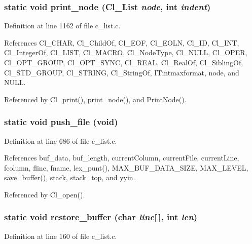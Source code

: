 \subsubsection{\setlength{\rightskip}{0pt plus 5cm}static void print\_\-node (\bf{Cl\_\-List} {\em node}, int {\em indent})\hspace{0.3cm}{\tt  [static]}}\label{c__list_8c_5ea3000e9486033d0f247911774ad4b1}




Definition at line 1162 of file c\_\-list.c.

References Cl\_\-CHAR, Cl\_\-Child\-Of, Cl\_\-EOF, Cl\_\-EOLN, Cl\_\-ID, Cl\_\-INT, Cl\_\-Integer\-Of, Cl\_\-LIST, Cl\_\-MACRO, Cl\_\-Node\-Type, Cl\_\-NULL, Cl\_\-OPER, Cl\_\-OPT\_\-GROUP, Cl\_\-OPT\_\-SYNC, Cl\_\-REAL, Cl\_\-Real\-Of, Cl\_\-Sibling\-Of, Cl\_\-STD\_\-GROUP, Cl\_\-STRING, Cl\_\-String\-Of, ITintmaxformat, node, and NULL.

Referenced by Cl\_\-print(), print\_\-node(), and Print\-Node().
\subsubsection{\setlength{\rightskip}{0pt plus 5cm}static void push\_\-file (void)\hspace{0.3cm}{\tt  [static]}}\label{c__list_8c_a0a102ac94b741d6b2997cf59926c5a5}




Definition at line 686 of file c\_\-list.c.

References buf\_\-data, buf\_\-length, current\-Column, current\-File, current\-Line, fcolumn, fline, fname, lex\_\-punt(), MAX\_\-BUF\_\-DATA\_\-SIZE, MAX\_\-LEVEL, save\_\-buffer(), stack, stack\_\-top, and yyin.

Referenced by Cl\_\-open().
\subsubsection{\setlength{\rightskip}{0pt plus 5cm}static void restore\_\-buffer (char {\em line}[$\,$], int {\em len})\hspace{0.3cm}{\tt  [static]}}\label{c__list_8c_8e206134c78348e6b8b52e2d293895dd}




Definition at line 160 of file c\_\-list.c.


